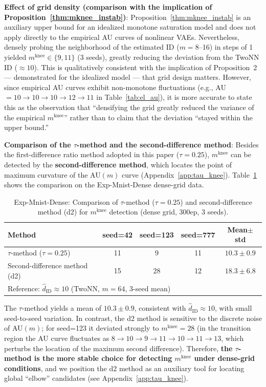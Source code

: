 \documentclass[make,article,submit,pdftex,moreauthors]{Definitions/mdpi}
\newcommand{\mknee}{m^{\mathrm{knee}}}
\begin{document}
\noindent
\textbf{Effect of grid density (comparison with the implication of Proposition~\ref{thm:mknee_instab})}:
Proposition~\ref{thm:mknee_instab} is an auxiliary upper bound for an idealized monotone
saturation model and does not apply directly to the empirical AU curves of nonlinear VAEs.
Nevertheless, densely probing the neighborhood of the estimated ID ($m = 8$--16) in steps of 1
yielded $\mknee \in \{9, 11\}$ (3 seeds), greatly reducing the deviation from the TwoNN ID
($\approx 10$).
This is qualitatively consistent with the implication of Proposition~2 --- demonstrated for
the idealized model --- that grid design matters.
However, since empirical AU curves exhibit non-monotone fluctuations
(e.g., AU$=10 \to 10 \to 10 \to 12 \to 11$ in Table~\ref{tab:el_au}), it is more accurate to
state this as the observation that ``densifying the grid greatly reduced the variance of the
empirical $\mknee$'' rather than to claim that the deviation ``stayed within the upper bound.''

\noindent
\textbf{Comparison of the $\tau$-method and the second-difference method}:
Besides the first-difference ratio method adopted in this paper ($\tau = 0.25$), $\mknee$ can
be detected by the \textbf{second-difference method}, which locates the point of maximum
curvature of the AU$(m)$ curve (Appendix~\ref{app:tau_knee}).
Table~\ref{tab:el_knee_compare} shows the comparison on the Exp-Mnist-Dense dense-grid data.

\begin{table}[H]
\centering
\caption{Exp-Mnist-Dense: Comparison of $\tau$-method ($\tau=0.25$) and second-difference method (d2) for $\mknee$ detection (dense grid, 300ep, 3 seeds).}
\label{tab:el_knee_compare}
\small
\begin{tabular}{lcccc}
\toprule
Method & seed=42 & seed=123 & seed=777 & Mean$\pm$std \\
\midrule
$\tau$-method ($\tau=0.25$) & 11 & 9  & 11 & $10.3 \pm 0.9$ \\
Second-difference method (d2) & 15 & 28 & 12 & $18.3 \pm 6.8$ \\
\midrule
\multicolumn{5}{l}{Reference: $\hat{d}_\mathrm{ID} \approx 10$ (TwoNN, $m=64$, 3-seed mean)} \\
\bottomrule
\end{tabular}
\end{table}

The $\tau$-method yields a mean of $10.3 \pm 0.9$, consistent with
$\hat{d}_\mathrm{ID} \approx 10$, with small seed-to-seed variation.
In contrast, the d2 method is sensitive to the discrete noise of AU$(m)$; for seed=123 it
deviated strongly to $\mknee = 28$ (in the transition region the AU curve fluctuates as
$8 \to 10 \to 9 \to 11 \to 10 \to 11 \to 13$, which perturbs the location of the maximum
second difference).
Therefore, \textbf{the $\tau$-method is the more stable choice for detecting $\mknee$ under
dense-grid conditions}, and we position the d2 method as an auxiliary tool for locating
global ``elbow'' candidates (see Appendix~\ref{app:tau_knee}).
\end{document}
